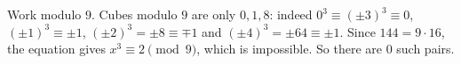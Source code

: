 Work modulo $9$. Cubes modulo $9$ are only $0,1,8$: indeed $0^3\equiv(\pm3)^3\equiv0$, $(\pm1)^3\equiv\pm1$, $(\pm2)^3=\pm8\equiv\mp1$ and $(\pm4)^3=\pm64\equiv\pm1$. Since $144=9\cdot16$, the equation gives $x^3\equiv2\pmod9$, which is impossible. So there are $\boxed{0}$ such pairs.
